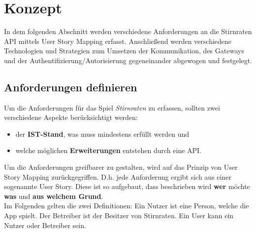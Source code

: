 \section{Konzept}
In dem folgenden Abschnitt werden verschiedene Anforderungen an die Stirnraten API mittels User Story Mapping erfasst. Anschließend werden verschiedene Technologien und Strategien zum Umsetzen der Kommunikation, des Gateways und der Authentifizierung/Autorisierung gegeneinander abgewogen und festgelegt.

\subsection{Anforderungen definieren}
Um die Anforderungen für das Spiel \textit{Stirnraten} zu erfassen, sollten zwei verschiedene Aspekte berücksichtigt werden: 

\begin{itemize}
	\item der \textbf{IST-Stand}, was muss mindestens erfüllt werden und 
	\item welche möglichen \textbf{Erweiterungen} entstehen durch eine API.
\end{itemize}

Um die Anforderungen greifbarer zu gestalten, wird auf das Prinzip von User Story Mapping zurückgegriffen. D.h. jede Anforderung ergibt sich aus einer sogenannte User Story. Diese ist so aufgebaut, dass beschrieben wird \textbf{wer} möchte \textbf{was} und \textbf{aus welchem Grund}.\cite{UserStoryMapping}\\

Im Folgenden gelten die zwei Definitionen: Ein Nutzer ist eine Person, welche die App spielt. Der Betreiber ist der Besitzer von Stirnraten. Ein User kann ein Nutzer oder Betreiber sein. \\

